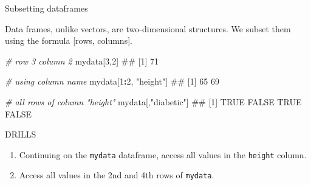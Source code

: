 \documentclass[ignorenonframetext,]{beamer}
\newenvironment{Shaded}{\begin{snugshade}}{\end{snugshade}}
\newcommand{\DecValTok}[1]{\textcolor[rgb]{0.00,0.00,0.81}{#1}}
\newcommand{\StringTok}[1]{\textcolor[rgb]{0.31,0.60,0.02}{#1}}
\newcommand{\CommentTok}[1]{\textcolor[rgb]{0.56,0.35,0.01}{\textit{#1}}}
\newcommand{\OperatorTok}[1]{\textcolor[rgb]{0.81,0.36,0.00}{\textbf{#1}}}
\newcommand{\NormalTok}[1]{#1}
\providecommand{\tightlist}{%
  \setlength{\itemsep}{0pt}\setlength{\parskip}{0pt}}
\begin{document}
\begin{frame}[fragile]

\begin{block}{Subsetting dataframes}

Data frames, unlike vectors, are two-dimensional structures. We subset
them using the formula {[}rows, columns{]}.

\begin{Shaded}
\begin{Highlighting}[]
\CommentTok{# row 3 column 2}
\NormalTok{mydata[}\DecValTok{3}\NormalTok{,}\DecValTok{2}\NormalTok{]}
\NormalTok{## [1] 71}
\end{Highlighting}
\end{Shaded}

\end{block}

\end{frame}

\begin{frame}[fragile]

\begin{Shaded}
\begin{Highlighting}[]
\CommentTok{# using column name}
\NormalTok{mydata[}\DecValTok{1}\OperatorTok{:}\DecValTok{2}\NormalTok{, }\StringTok{"height"}\NormalTok{]}
\NormalTok{## [1] 65 69}
\end{Highlighting}
\end{Shaded}

\begin{Shaded}
\begin{Highlighting}[]
\CommentTok{# all rows of column "height"}
\NormalTok{mydata[,}\StringTok{"diabetic"}\NormalTok{]}
\NormalTok{## [1]  TRUE FALSE  TRUE FALSE}
\end{Highlighting}
\end{Shaded}

\end{frame}

\begin{frame}[fragile]{DRILLS}

\begin{enumerate}[<+->]
\def\labelenumi{\arabic{enumi}.}
\tightlist
\item
  Continuing on the \texttt{mydata} dataframe, access all values in the
  \texttt{height} column.
\item
  Access all values in the 2nd and 4th rows of \texttt{mydata}.
\end{enumerate}

\end{frame}
\end{document}
